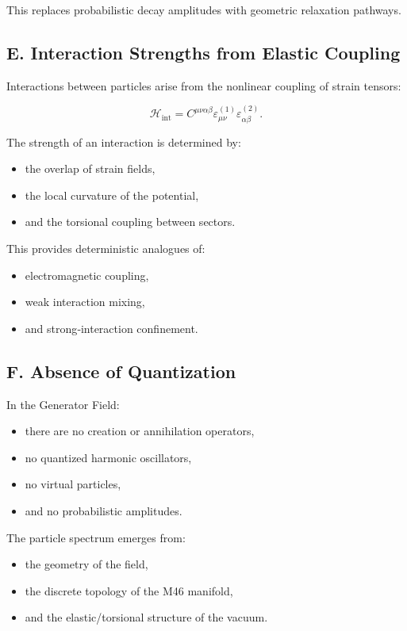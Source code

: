 \documentclass[reprint,amsmath,amssymb,aps,prl,floatfix]{revtex4-2}
\begin{document}
This replaces probabilistic decay amplitudes with geometric relaxation pathways.

\subsection{E. Interaction Strengths from Elastic Coupling}

Interactions between particles arise from the nonlinear coupling of strain tensors:

\[
\mathcal{H}_{\mathrm{int}}
=
C^{\mu\nu\alpha\beta}
\varepsilon_{\mu\nu}^{(1)}
\varepsilon_{\alpha\beta}^{(2)}.
\]

The strength of an interaction is determined by:
\begin{itemize}
\item the overlap of strain fields,  
\item the local curvature of the potential,  
\item and the torsional coupling between sectors.
\end{itemize}
\medskip

This provides deterministic analogues of:
\begin{itemize}
\item electromagnetic coupling,  
\item weak interaction mixing,  
\item and strong‑interaction confinement.
\end{itemize}

\subsection{F. Absence of Quantization}

In the Generator Field:
\begin{itemize}
\item there are no creation or annihilation operators,  
\item no quantized harmonic oscillators,  
\item no virtual particles,  
\item and no probabilistic amplitudes.
\end{itemize}
\medskip

The particle spectrum emerges from:
\begin{itemize}
\item the geometry of the field,  
\item the discrete topology of the M46 manifold,  
\item and the elastic/torsional structure of the vacuum.
\end{itemize}
\end{document}
